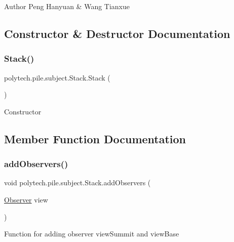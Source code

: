 \begin{DoxyAuthor}{Author}
Peng Hanyuan \& Wang Tianxue 
\end{DoxyAuthor}


\subsection{Constructor \& Destructor Documentation}
\hypertarget{classpolytech_1_1pile_1_1subject_1_1_stack_a65d85fe80877b26c71f44b30cba1692a}{}\label{classpolytech_1_1pile_1_1subject_1_1_stack_a65d85fe80877b26c71f44b30cba1692a} 
\subsubsection{\texorpdfstring{Stack()}{Stack()}}
{\footnotesize\ttfamily polytech.\+pile.\+subject.\+Stack.\+Stack (\begin{DoxyParamCaption}{ }\end{DoxyParamCaption})}

Constructor 

\subsection{Member Function Documentation}
\hypertarget{classpolytech_1_1pile_1_1subject_1_1_stack_a705c6023868cbd440d87b04cfe7cbd85}{}\label{classpolytech_1_1pile_1_1subject_1_1_stack_a705c6023868cbd440d87b04cfe7cbd85} 
\subsubsection{\texorpdfstring{add\+Observers()}{addObservers()}}
{\footnotesize\ttfamily void polytech.\+pile.\+subject.\+Stack.\+add\+Observers (\begin{DoxyParamCaption}\item[{\hyperlink{interfacepolytech_1_1pile_1_1observers_1_1_observer}{Observer}}]{view }\end{DoxyParamCaption})}

Function for adding observer view\+Summit and view\+Base


